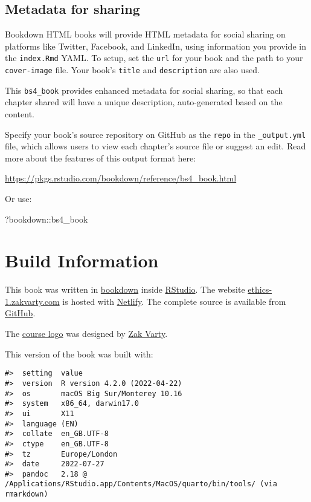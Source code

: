 \documentclass[
]{book}
\newenvironment{Shaded}{\begin{snugshade}}{\end{snugshade}}
\newcommand{\NormalTok}[1]{#1}
\newcommand{\SpecialCharTok}[1]{\textcolor[rgb]{0.00,0.00,0.00}{#1}}
\theoremstyle{definition}
\theoremstyle{definition}
\theoremstyle{definition}
\theoremstyle{definition}
\theoremstyle{remark}
\begin{document}
\hypertarget{metadata-for-sharing}{%
\section{Metadata for sharing}\label{metadata-for-sharing}}

Bookdown HTML books will provide HTML metadata for social sharing on platforms like Twitter, Facebook, and LinkedIn, using information you provide in the \texttt{index.Rmd} YAML. To setup, set the \texttt{url} for your book and the path to your \texttt{cover-image} file. Your book's \texttt{title} and \texttt{description} are also used.

This \texttt{bs4\_book} provides enhanced metadata for social sharing, so that each chapter shared will have a unique description, auto-generated based on the content.

Specify your book's source repository on GitHub as the \texttt{repo} in the \texttt{\_output.yml} file, which allows users to view each chapter's source file or suggest an edit. Read more about the features of this output format here:

\url{https://pkgs.rstudio.com/bookdown/reference/bs4_book.html}

Or use:

\begin{Shaded}
\begin{Highlighting}[]
\NormalTok{?bookdown}\SpecialCharTok{::}\NormalTok{bs4\_book}
\end{Highlighting}
\end{Shaded}

\hypertarget{build-information}{%
\chapter*{Build Information}\label{build-information}}

This book was written in \href{http://bookdown.org/}{bookdown} inside \href{http://www.rstudio.com/ide/}{RStudio}. The website \href{https://ethics-1.zakvarty.com}{ethics-1.zakvarty.com} is hosted with \href{https://www.netlify.com}{Netlify}. The complete source is available from \href{https://github.com/zakvarty/ethics-1}{GitHub}.

The \href{assets/ethics-1-logo.png}{course logo} was designed by \href{https://www.zakvarty.com/}{Zak Varty}.

This version of the book was built with:

\begin{verbatim}
#>  setting  value
#>  version  R version 4.2.0 (2022-04-22)
#>  os       macOS Big Sur/Monterey 10.16
#>  system   x86_64, darwin17.0
#>  ui       X11
#>  language (EN)
#>  collate  en_GB.UTF-8
#>  ctype    en_GB.UTF-8
#>  tz       Europe/London
#>  date     2022-07-27
#>  pandoc   2.18 @ /Applications/RStudio.app/Contents/MacOS/quarto/bin/tools/ (via rmarkdown)
\end{verbatim}
\end{document}
